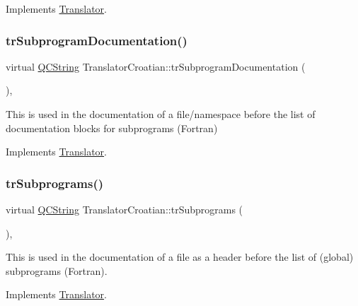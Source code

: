 Implements \mbox{\hyperlink{class_translator}{Translator}}.

\mbox{\label{class_translator_croatian_ab4fa9162851c02e3b7332bd6e6ce75b7}} 
\subsubsection{\texorpdfstring{trSubprogramDocumentation()}{trSubprogramDocumentation()}}
{\footnotesize\ttfamily virtual \mbox{\hyperlink{class_q_c_string}{Q\+C\+String}} Translator\+Croatian\+::tr\+Subprogram\+Documentation (\begin{DoxyParamCaption}{ }\end{DoxyParamCaption})\hspace{0.3cm}{\ttfamily [inline]}, {\ttfamily [virtual]}}

This is used in the documentation of a file/namespace before the list of documentation blocks for subprograms (Fortran) 

Implements \mbox{\hyperlink{class_translator}{Translator}}.

\mbox{\label{class_translator_croatian_af5a1ef3be00c4213e9f98f1064233407}} 
\subsubsection{\texorpdfstring{trSubprograms()}{trSubprograms()}}
{\footnotesize\ttfamily virtual \mbox{\hyperlink{class_q_c_string}{Q\+C\+String}} Translator\+Croatian\+::tr\+Subprograms (\begin{DoxyParamCaption}{ }\end{DoxyParamCaption})\hspace{0.3cm}{\ttfamily [inline]}, {\ttfamily [virtual]}}

This is used in the documentation of a file as a header before the list of (global) subprograms (Fortran). 

Implements \mbox{\hyperlink{class_translator}{Translator}}.

\mbox{\label{class_translator_croatian_aeab4867516f03a2920bb07afa909403b}} 
